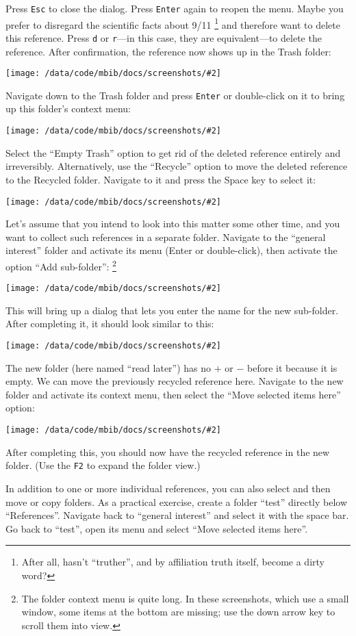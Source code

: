 \documentclass[10pt]{article}
\newcommand{\screenshot}[2][]{%
\begin{center}
\texttt{[image: /data/code/mbib/docs/screenshots/\#2]}
\end{center}}
\begin{document}
Press \texttt{Esc} to close the dialog. Press \texttt{Enter} again to reopen the menu. Maybe you prefer to disregard the scientific facts about 9/11%
%
\footnote{After all, hasn't ``truther'', and by affiliation truth itself, become a dirty word?}
%
and therefore want to delete this reference. Press \texttt{d} or \texttt{r}---in this case, they are equivalent---to delete the reference. After confirmation, the reference now shows up in the Trash folder:

\screenshot{harrit-trash}

\noindent Navigate down to the Trash folder and press \texttt{Enter} or double-click on it to bring up this folder's context menu:

\screenshot{trash-menu}

\noindent Select the ``Empty Trash'' option to get rid of the deleted reference entirely and irreversibly. Alternatively, use the ``Recycle'' option to move the deleted reference to the Recycled folder. Navigate to it and press the Space key to select it: 

\screenshot{harrit-recycled}

\noindent Let's assume that you intend to look into this matter some other time, and you want to collect such references in a separate folder. Navigate to the ``general interest'' folder and activate its menu (Enter or double-click), then activate the option ``Add sub-folder'':%
%
\footnote{The folder context menu is quite long. In these screenshots, which use a small window, some items at the bottom are missing; use the down arrow key to scroll them into view.}

\screenshot{folder-menu}

\noindent This will bring up a dialog that lets you enter the name for the new sub-folder. After completing it, it should look similar to this:

\screenshot{read-later}

\noindent The new folder (here named ``read later'') has no $+$ or $-$ before it because it is empty. We can move the previously recycled reference here. Navigate to the new folder and activate its context menu, then select the ``Move selected items here'' option:

\screenshot{move-here}

\noindent After completing this, you should now have the recycled reference in the new folder. (Use the \texttt{F2} to expand the folder view.)

In addition to one or more individual references, you can also select and then move or copy folders. As a practical exercise, create a folder ``test'' directly below ``References''. Navigate back to ``general interest'' and select it with the space bar. Go back to ``test'', open its menu and select ``Move selected items here''. 
\end{document}
